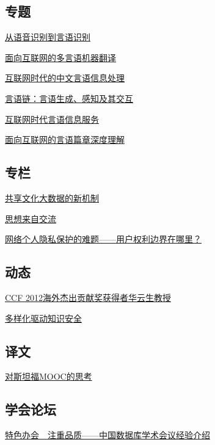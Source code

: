 \documentclass[a4paper]{article}
\begin{document}
\subsection{专题}
\href{http://history.ccf.org.cn/resources/1190201776262/2013/05/13/3.pdf}{从语音识别到言语识别}

\href{http://history.ccf.org.cn/resources/1190201776262/2013/05/13/4.pdf}{面向互联网的多言语机器翻译}

\href{http://history.ccf.org.cn/resources/1190201776262/2013/05/13/1.pdf}{互联网时代的中文言语信息处理}

\href{http://history.ccf.org.cn/resources/1190201776262/2013/05/13/2.pdf}{言语链：言语生成、感知及其交互}

\href{http://history.ccf.org.cn/resources/1190201776262/2013/05/13/6.pdf}{互联网时代言语信息服务}

\href{http://history.ccf.org.cn/resources/1190201776262/2013/05/13/5.pdf}{面向互联网的言语篇章深度理解}

\subsection{专栏}
\href{http://history.ccf.org.cn/resources/1190201776262/2013/05/13/7.pdf}{共享文化大数据的新机制}

\href{http://history.ccf.org.cn/resources/1190201776262/2013/05/13/9.pdf}{思想来自交流}

\href{http://history.ccf.org.cn/resources/1190201776262/2013/05/13/8.pdf}{网络个人隐私保护的难题——用户权利边界在哪里？}

\subsection{动态}
\href{http://history.ccf.org.cn/resources/1190201776262/2013/05/13/10.pdf}{CCF 2012海外杰出贡献奖获得者华云生教授}

\href{http://history.ccf.org.cn/resources/1190201776262/2013/05/13/11.pdf}{多样化驱动知识安全}

\subsection{译文}
\href{http://history.ccf.org.cn/resources/1190201776262/2013/05/13/12.pdf}{对斯坦福MOOC的思考}

\subsection{学会论坛}
\href{http://history.ccf.org.cn/resources/1190201776262/2013/05/13/20.pdf}{特色办会　注重品质——中国数据库学术会议经验介绍}
\end{document}
